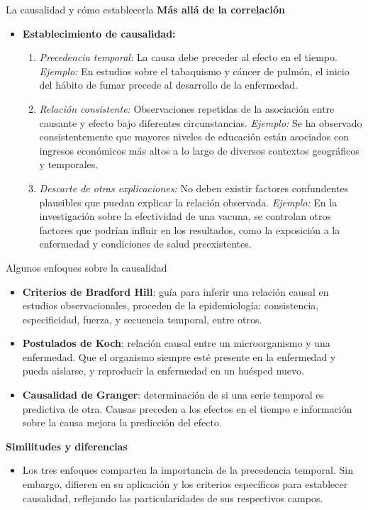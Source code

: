 ﻿\documentclass{beamer}
\begin{document}
\begin{frame}{La causalidad y cómo establecerla}
\textbf{Más allá de la correlación}

\begin{itemize}
    \item \textbf{Establecimiento de causalidad:}
    \begin{enumerate}
        \item \textit{Precedencia temporal:} La causa debe preceder al efecto en el tiempo. \textit{Ejemplo:} En estudios sobre el tabaquismo y cáncer de pulmón, el inicio del hábito de fumar precede al desarrollo de la enfermedad.
        \item \textit{Relación consistente:} Observaciones repetidas de la asociación entre causante y efecto bajo diferentes circunstancias. \textit{Ejemplo:} Se ha observado consistentemente que mayores niveles de educación están asociados con ingresos económicos más altos a lo largo de diversos contextos geográficos y temporales.
        \item \textit{Descarte de otras explicaciones:} No deben existir factores confundentes plausibles que puedan explicar la relación observada. \textit{Ejemplo:} En la investigación sobre la efectividad de una vacuna, se controlan otros factores que podrían influir en los resultados, como la exposición a la enfermedad y condiciones de salud preexistentes.
    \end{enumerate}
\end{itemize}
\end{frame}

\begin{frame}{Algunos enfoques sobre la causalidad}
\begin{itemize}
    \item \textbf{Criterios de Bradford Hill}: guía para inferir una relación causal en estudios observacionales, proceden de la epidemiología: consistencia, especificidad, fuerza, y secuencia temporal, entre otros.
    \item \textbf{Postulados de Koch}: relación causal entre un microorganismo y una enfermedad. Que el organismo siempre esté presente en la enfermedad y pueda aislarse, y reproducir la enfermedad en un huésped nuevo.
    \item \textbf{Causalidad de Granger}: determinación de si una serie temporal es predictiva de otra. Causas preceden a los efectos en el tiempo e información sobre la causa mejora la predicción del efecto.
\end{itemize}

\textbf{Similitudes y diferencias}
\begin{itemize}
    \item Los tres enfoques comparten la importancia de la precedencia temporal. Sin embargo, difieren en su aplicación y los criterios específicos para establecer causalidad, reflejando las particularidades de sus respectivos campos.
\end{itemize}
\end{frame}
\end{document}
